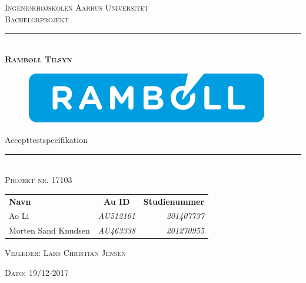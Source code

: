 \newcommand{\HRule}{\rule{\linewidth}{0.1mm}} %
\thispagestyle{empty}
\begin{center}
	\vspace{3cm}
	\textsc{\LARGE Ingeniørhøjskolen Aarhus Universitet}\\[1.5cm] %
	
	\textsc{\large Bachelorprojekt}\\[2.5 cm] 
	
	\HRule \\[0.8cm]
	{\huge \bfseries \textsc{Rambøll Tilsyn}} 
		\begin{figure}[h!]
		\centering
		\includegraphics[width=0.7\linewidth]{Forside/Logo}
	\end{figure}

	{\LARGE Accepttestspecifikation} \\[0.4cm]
	\HRule \\[1.5cm]
	
	\textsc{\large Projekt nr. 17103}\\
	\vspace{0.5 in}
	\begin{center}
		\begin{tabular}{l c r}
			\textbf{Navn} & \textbf{Au ID} & \textbf{Studienummer} \\
			Ao Li & \textsl{AU512161} & \textsl{201407737}    \\
			Morten Sand Knudsen & \textsl{AU463338} & \textsl{201270955}  \\
		\end{tabular}
	\end{center}
	\vspace{0.5 in}
	
	\textsc{\large Vejleder: Lars Christian Jensen}
	\vspace{0.5 in}
	
	\textsc{\large Dato: 19/12-2017}\\
	\vfill %
	
\end{center} %

\clearpage

\newpage